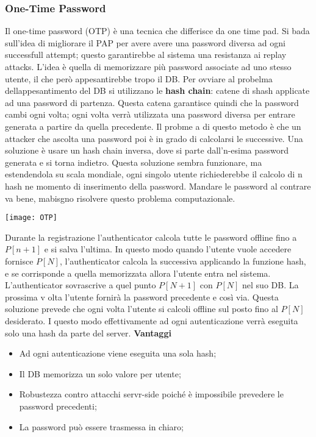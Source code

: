 \documentclass{article}
\theoremstyle{remark}
\begin{document}
\subsubsection{One-Time Password}
Il one-time password (OTP) è una tecnica che differisce da one time pad. Si bada sull'idea di migliorare il PAP per avere avere una password diversa ad ogni successfull attempt; questo garantirebbe al sistema una resistanza ai replay attacks. L'idea è quella di memorizzare più password associate ad uno stesso utente, il che però appesantirebbe tropo il DB.
Per ovviare al probelma dellappesantimento del DB si utilizzano le \textbf{hash chain}: catene di shash applicate ad una password di partenza. Questa catena garantisce quindi che la password cambi ogni volta; ogni volta verrà utilizzata una password diversa per entrare generata a partire da quella precedente. Il probme a di questo metodo è che un attacker che ascolta una password poi è in grado di calcolarsi le successive. Una soluzione è usare un hash chain inversa, dove si parte dall'n-esima password generata e si torna indietro. Questa soluzione sembra funzionare, ma estendendola su scala mondiale, ogni singolo utente richiederebbe il calcolo di n hash ne momento di inserimento della password.\newline
Mandare le password al contrare va bene, mabisgno risolvere questo problema computazionale.\newline
\begin{center}
    \texttt{[image: OTP]}
\end{center}
Durante la registrazione l'authenticator calcola tutte le password offline fino a $P[n+1]$ e si salva l'ultima. In questo modo quando l'utente vuole accedere fornisce $P[N]$, l'authenticator calcola la successiva applicando la funzione hash, e se corrisponde a quella memorizzata allora l'utente entra nel sistema. L'authenticator sovrascrive a quel punto $P[N+1]$ con $P[N]$ nel suo DB. La prossima v olta l'utente fornirà la password precedente e così via.\newline
Questa soluzione prevede che ogni volta l'utente si calcoli offline sul posto fino al $P[N]$ desiderato. I questo modo effettivamente ad ogni autenticazione verrà eseguita solo una hash da parte del server.
\textbf{Vantaggi}
\begin{itemize}
    \item Ad ogni autenticazione viene eseguita una sola hash;
    \item Il DB memorizza un solo valore per utente;
    \item Robustezza contro attacchi servr-side poiché è impossibile prevedere le password precedenti;
    \item La password può essere trasmessa in chiaro;
\end{itemize}
\end{document}
